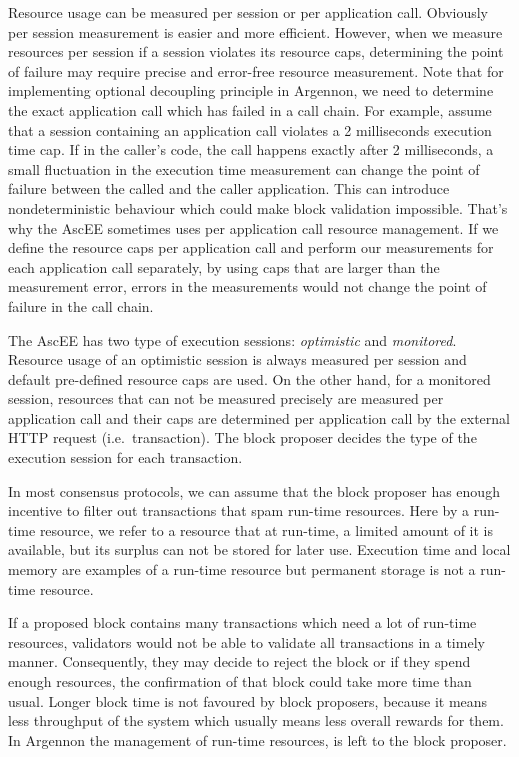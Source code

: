 Resource usage can be measured per session or per application call. Obviously per session measurement is
easier and more efficient. However, when we measure resources per session if
a session violates its resource caps, determining the point of failure may require precise and error-free resource
measurement. Note that for implementing optional decoupling principle in Argennon, we need to determine the exact
application call which has failed in a call chain. For example, assume that a session containing an application call
violates a 2 milliseconds execution time cap. If in the caller's code, the call happens exactly after 2 milliseconds,
a small fluctuation in the execution time measurement can
change the point of failure between the called and the caller application. This can introduce nondeterministic
behaviour which could make block validation impossible. That's why the AscEE sometimes uses per application call
resource management. If we define the resource caps per application call and perform our measurements for each
application call separately, by using caps that are larger than the measurement error, errors in the
measurements would not change the point of failure in the call chain.

The AscEE has two type of execution sessions: \emph{optimistic} and \emph{monitored}. Resource usage of an optimistic
session is always measured per session and default pre-defined resource caps are used. On the other hand, for a
monitored session, resources that can not be measured precisely are measured per application call and their caps are
determined per application call by the external HTTP request (i.e.\ transaction). The block proposer decides the
type of the execution session for each transaction.

In most consensus protocols, we can assume that the block proposer has enough incentive to filter out transactions
that spam run-time resources. Here by a run-time resource, we refer to a resource that at run-time, a limited amount
of it is available, but its surplus can not be stored for later use. Execution time and local memory are
examples of a run-time resource but permanent storage is not a run-time resource.

If a proposed block contains many transactions which need a lot of run-time resources, validators would not
be able to validate all transactions in a timely manner. Consequently, they may decide to reject the block or if they
spend enough resources, the confirmation of that block could take more time than usual. Longer block time is not
favoured by block proposers, because it means less throughput of the system which usually means less overall rewards
for them. In Argennon the management of run-time resources, is left to the block proposer.

